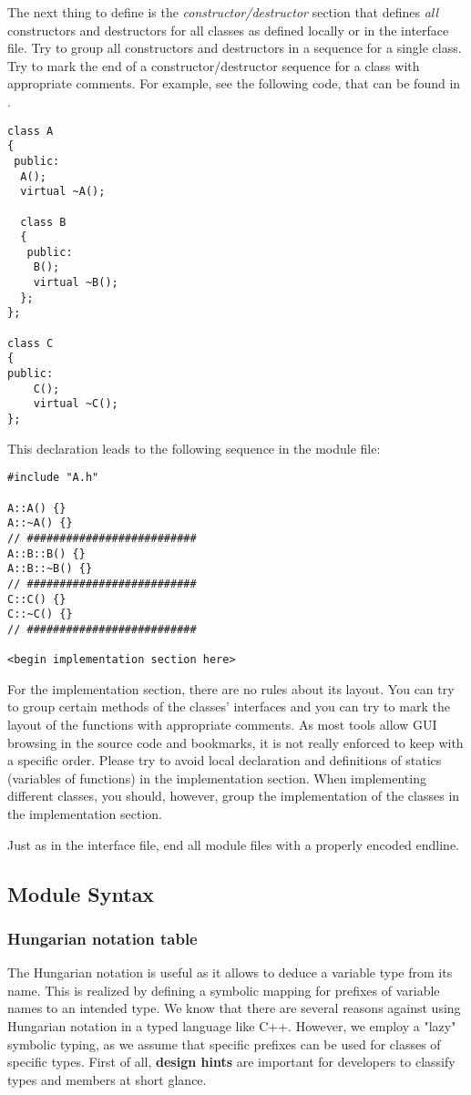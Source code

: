 The next thing to define is the \emph{constructor/destructor} section that defines \emph{all} constructors and destructors for all classes as defined locally or in the interface file.
Try to group all constructors and destructors in a sequence for a single class.
Try to mark the end of a constructor/destructor sequence for a class with appropriate comments.
For example, see the following code, that can be found in .
\begin{verbatim}
class A
{
 public:
  A();
  virtual ~A();
  
  class B
  {
   public:
    B();
    virtual ~B();
  };
}; 

class C
{
public:
	C();
	virtual ~C();
};
\end{verbatim}
This declaration leads to the following sequence in the module file:
\begin{verbatim}
#include "A.h"

A::A() {}
A::~A() {}
// ##########################
A::B::B() {}
A::B::~B() {}
// ##########################
C::C() {}
C::~C() {}
// ##########################

<begin implementation section here>
\end{verbatim}

For the implementation section, there are no rules about its layout.
You can try to group certain methods of the classes' interfaces and you can try to mark the layout of the functions with appropriate comments.
As most tools allow GUI browsing in the source code and bookmarks, it is not really enforced to keep with a specific order.
Please try to avoid local declaration and definitions of statics (variables of functions) in the implementation section.
When implementing different classes, you should, however, group the implementation of the classes in the implementation section.

Just as in the interface file, end all module files with a properly encoded endline.


\subsection{Module Syntax}

\subsubsection{Hungarian notation table}\label{sec:HungarianNotation}
The Hungarian notation is useful as it allows to deduce a variable type from its name.
This is realized by defining a symbolic mapping for prefixes of variable names to an intended type.
We know that there are several reasons against using Hungarian notation in a typed language like C++.
However, we employ a "lazy" symbolic typing, as we assume that specific prefixes can be used for classes of specific types.
First of all, \textbf{design hints} are important for developers to classify types and members at short glance.


